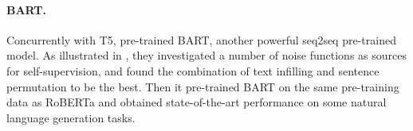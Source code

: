 \paragraph{BART.}

Concurrently with T5, \citet{DBLP:conf/acl/LewisLGGMLSZ20} pre-trained BART, another powerful seq2seq pre-trained model. As illustrated in , they investigated a number of noise functions as sources for self-supervision, and found the combination of text infilling and sentence permutation to be the best. Then it pre-trained BART on the same pre-training data as RoBERTa and obtained state-of-the-art performance on some natural language generation tasks. 
